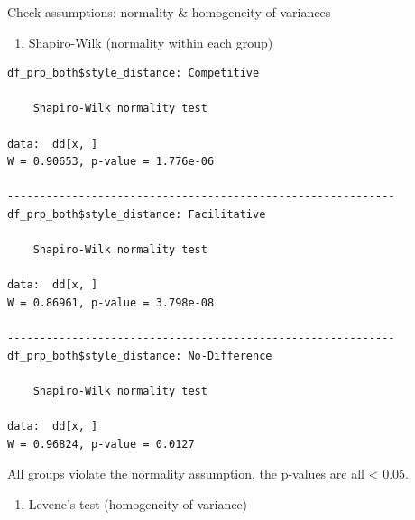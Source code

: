 \documentclass[
  letterpaper,
  DIV=11,
  numbers=noendperiod]{scrartcl}
\newenvironment{Shaded}{\begin{snugshade}}{\end{snugshade}}
\newcommand{\AttributeTok}[1]{\textcolor[rgb]{0.40,0.45,0.13}{#1}}
\newcommand{\FunctionTok}[1]{\textcolor[rgb]{0.28,0.35,0.67}{#1}}
\newcommand{\NormalTok}[1]{\textcolor[rgb]{0.00,0.23,0.31}{#1}}
\newcommand{\OtherTok}[1]{\textcolor[rgb]{0.00,0.23,0.31}{#1}}
\newcommand{\SpecialCharTok}[1]{\textcolor[rgb]{0.37,0.37,0.37}{#1}}
\providecommand{\tightlist}{%
  \setlength{\itemsep}{0pt}\setlength{\parskip}{0pt}}\usepackage{longtable,booktabs,array}
\begin{document}
Check assumptions: normality \& homogeneity of variances

\begin{enumerate}
\def\labelenumi{\arabic{enumi}.}
\tightlist
\item
  Shapiro-Wilk (normality within each group)
\end{enumerate}

\begin{Shaded}
\end{Shaded}

\begin{verbatim}
df_prp_both$style_distance: Competitive

    Shapiro-Wilk normality test

data:  dd[x, ]
W = 0.90653, p-value = 1.776e-06

------------------------------------------------------------ 
df_prp_both$style_distance: Facilitative

    Shapiro-Wilk normality test

data:  dd[x, ]
W = 0.86961, p-value = 3.798e-08

------------------------------------------------------------ 
df_prp_both$style_distance: No-Difference

    Shapiro-Wilk normality test

data:  dd[x, ]
W = 0.96824, p-value = 0.0127
\end{verbatim}

All groups violate the normality assumption, the p-values are all
\textless{} 0.05.

\begin{enumerate}
\def\labelenumi{\arabic{enumi}.}
\setcounter{enumi}{1}
\tightlist
\item
  Levene's test (homogeneity of variance)
\end{enumerate}

\begin{Shaded}
\end{Shaded}
\end{document}
